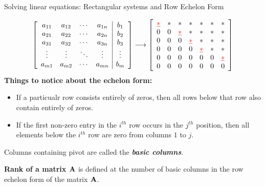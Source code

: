 \documentclass[aspectratio=169]{beamer}
\def\mf{\ensuremath\mathbf}
\begin{document}
\begin{frame}[t]{Solving linear equations: Rectangular systems and Row Echelon Form}
\vspace{-0.5cm}
\begin{small}
\[
\left[
\begin{array}{cccc|c}
a_{11} & a_{12} & \cdots & a_{1n} & b_1 \\
a_{21} & a_{22} & \cdots & a_{2n} & b_2 \\
a_{31} & a_{32} & \cdots & a_{3n} & b_3 \\
\vdots & \vdots & \ddots & \vdots & \vdots \\
a_{m1} & a_{m2} & \cdots & a_{mn} & b_m \\
\end{array}
\right] \longrightarrow
\left[
\begin{array}{cccccccc}
\color{red}{\underline{\ast}} & \ast & \ast & \ast & \ast & \ast & \ast \\
0 & 0 & \color{red}{\underline{\ast}}  & \ast  & \ast  & \ast  & \ast \\
0 & 0 & 0 & \color{red}{\underline{\ast}}  & \ast  & \ast  & \ast \\
0 & 0 & 0 & 0 & \color{red}{\underline{\ast}}  & \ast  & \ast \\
0 & 0 & 0 & 0 & 0 & 0 & \color{red}{\underline{\ast}} \\
0 & 0 & 0 & 0 & 0 & 0 & 0 \\
\end{array}
\right]
\]
\textbf{Things to notice about the echelon form:}
\begin{itemize}
\item If a particualr row consists entirely of zeros, then all rows below that row also contain entirely of zeros.
\item If the first non-zero entry in the $i^{th}$ row occurs in the $j^{th}$ position, then all elements below the $i^{th}$ row are zero from columns $1$ to $j$.
\end{itemize}

Columns containing pivot are called the \textbf{\textit{basic columns}}.
\end{small}

\begin{tcolorbox}[colback=gray!20,colframe=black]
\textbf{Rank of a matrix $\mf{A}$} is defined at the number of basic columns in the row echelon form of the matrix $\mf{A}$.
\end{tcolorbox}
\end{frame}
\end{document}
